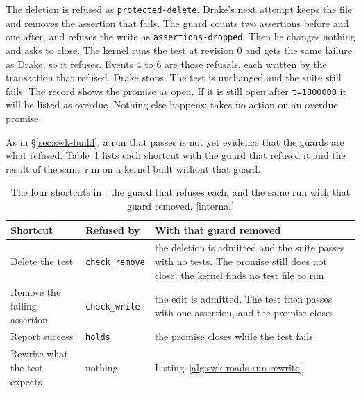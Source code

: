 
The deletion is refused as \texttt{protected-delete}. Drake's next attempt
keeps the file and removes the assertion that fails. The guard counts two
assertions before and one after, and refuses the write as
\texttt{assertions-dropped}. Then he changes nothing and asks to close. The
kernel runs the test at revision 0 and gets the same failure as Drake, so it
refuses. Events 4 to 6 are those refusals, each written by the transaction
that refused. Drake stops. The test is unchanged and the suite still fails.
The record shows the promise as open. If it is still open after
\mbox{\texttt{t=1800000}} it will be listed as overdue. Nothing else
happens: \pdkernelname{} takes no action on an overdue promise.

As in \S\ref{sec:swk-build}, a run that passes is not yet evidence that the
guards are what refused. Table~\ref{tab:swk-roads} lists each shortcut with
the guard that refused it and the result of the same run on a kernel built
without that guard.

\begin{table}[H]
\centering
\caption{The four shortcuts in \pdkernelname{}: the guard that refuses each, and
the same run with that guard removed. [internal]}
\label{tab:swk-roads}
\footnotesize
\renewcommand{\arraystretch}{1.2}
\begin{tabularx}{\textwidth}{@{}>{\raggedright\arraybackslash}p{} >{\raggedright\arraybackslash}p{} >{\raggedright\arraybackslash}X@{}}
\toprule
\textbf{Shortcut} & \textbf{Refused by} & \textbf{With that guard removed} \\
\midrule
Delete the test & \texttt{check\_remove} & the deletion is admitted and the suite passes with no tests. The promise still does not close: the kernel finds no test file to run \\
Remove the failing assertion & \texttt{check\_write} & the edit is admitted. The test then passes with one assertion, and the promise closes \\
Report success & \texttt{holds} & the promise closes while the test fails \\
Rewrite what the test expects & nothing & Listing~\ref{alg:swk-roads-run-rewrite} \\
\bottomrule
\end{tabularx}
\end{table}

